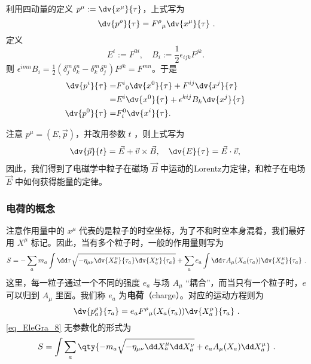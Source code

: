 利用四动量的定义 $p^\mu:=\dv{x^\mu}{\tau}$，上式写为
\begin{equation}
\dv{p^\rho}{\tau}={F^\rho}_{\mu}\dv{x^\mu}{\tau}~.
\end{equation}
定义
\begin{equation}
E^i:=F^{0i},\quad B_i:=\frac{1}{2}\epsilon_{ijk}F^{jk}.~
\end{equation}
则 $\epsilon^{imn}B_i=\frac{1}{2}(\delta^m_j\delta^{n}_k-\delta^m_k\delta^{n}_j)F^{jk}=F^{mn}$。于是
 \begin{equation}
 \begin{aligned}
  \dv{p^i}{\tau}=&{F^i}_{0}\dv{x^0}{\tau}+F^{ij}\dv{x^j}{\tau}\\
  =&{E^i}\dv{x^0}{\tau}+\epsilon^{kij}B_k\dv{x^j}{\tau}\\
  \dv{p^0}{\tau}=&F^{0}_i\dv{x^i}{\tau}.
 \end{aligned}~
 \end{equation}

 注意 $p^\mu=(E,\vec p)$，并改用参数 $t$ ，则上式写为
 \begin{equation}
 \dv{\vec p}{t}=\vec E+\vec v\times \vec B,\quad \dv{E}{\tau}=\vec E\cdot \vec v,~
 \end{equation}
 因此，我们得到了电磁学中粒子在磁场 $\vec B$ 中运动的Lorentz力定律，和粒子在电场 $\vec E$ 中如何获得能量的定律。

\subsubsection{电荷的概念}
注意作用量中的 $x^\mu$ 代表的是粒子的时空坐标，为了不和时空本身混肴，我们最好用 $X^\mu$ 标记。因此，当有多个粒子时，一般的作用量则写为
\begin{equation}\label{eq_EleGra_8}
S=-\sum_a m_a\int\dd \tau\sqrt{-\eta_{\mu\nu}\dv{X_a^\mu}{\tau_a}\dv{X_a^\nu}{\tau_a}}+\sum_a e_a\int\dd \tau A_\mu(X_a(\tau_a))\dv{X_a^\mu}{\tau_a}~.
\end{equation}
这里，每一粒子通过一个不同的强度 $e_a$ 与场 $A_\mu$ “耦合”，而当只有一个粒子时，$e$ 可以归到 $A_\mu$ 里面。我们称 $e_a$ 为\textbf{电荷}（charge）。对应的运动方程则为
\begin{equation}
\dv{p_a^\rho}{\tau_a}=e_a{F^\rho}_{\mu}(X_a(\tau_a))\dv{X_a^\mu}{\tau_a}~.
\end{equation}
\autoref{eq_EleGra_8} 无参数化的形式为
\begin{equation}
S=\int\sum_a \qty{-m_a\sqrt{-\eta_{\mu\nu}\dd X_a^\mu\dd X_a^\nu}+e_a A_\mu(X_a)\dd X_a^\mu}~.
\end{equation}

